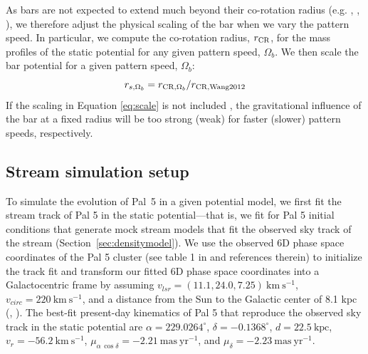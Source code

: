 \documentclass[twocolumn]{aastex62}
\newcommand{\msun}{\textrm{M}_\odot}
\newcommand{\kpc}{\textrm{kpc}}
\newcommand{\kms}{\ensuremath{\textrm{km}~\textrm{s}^{-1}}}
\newcommand{\masyr}{\ensuremath{\textrm{mas}~\textrm{yr}^{-1}}}
\newcommand{\todo}[1]{{\color{red} TODO: #1}}
\begin{document}
As bars are not expected to extend much beyond their co-rotation radius (e.g. \citealt{Debattista:2002}, \citealt{Debattista:2002b}, \citealt{weiner:1999}), we therefore adjust the physical scaling of the bar when we vary the pattern speed. %
In particular, we compute the co-rotation radius, $r_{\rm CR}$, for the mass profiles of the static potential for any given pattern speed, $\Omega_b$.
We then scale the bar potential for a given pattern speed, $\Omega_b$:
\begin{equation}\label{eq:scale}
r_{s, \Omega_b}  = r_{{\rm CR}, \Omega_b}/r_{{\rm CR, Wang 2012}}
\end{equation}
If the scaling in Equation \ref{eq:scale} is not included \citep[as in, e.g.,][]{Pearson:2017, Erkal:2017, Banik:2019}, the gravitational influence of the bar at a fixed radius will be too strong (weak) for faster (slower) pattern speeds, respectively.

%


\subsection{Stream simulation setup}
\label{sec:modeling}

To simulate the evolution of Pal~5 in a given potential model, we first fit the stream track of Pal 5 in the static potential---that is, we fit for Pal 5 initial conditions that generate mock stream models that fit the observed sky track of the stream (Section~\ref{sec:densitymodel}).
We use the observed 6D phase space coordinates of the Pal 5 cluster (see table 1 in \citealt{Pearson:2017} and references therein) to initialize the track fit and transform our fitted 6D phase space coordinates into a Galactocentric frame by assuming $v_{lsr} = (11.1, 24.0, 7.25) ~\kms$,  $v_{circ} = 220~\kms$, and a distance from the Sun to the Galactic center of 8.1 kpc (\citealt{Schonrich:2010}, \citealt{Schonrich:2012}).
The best-fit present-day kinematics of Pal 5 that reproduce the observed sky track in the static potential are $\alpha = 229.0264^\circ$, $\delta = -0.1368^\circ$, $d = 22.5~\kpc$, $v_r = -56.2~\kms$, $\mu_{\alpha\,\cos\delta} = -2.21~\masyr$, and $\mu_\delta = -2.23~\masyr$.
\end{document}
